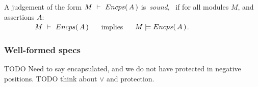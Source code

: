 \begin{definition}
\label{lem:encap-soundness}
A judgement of the form $M\ \vdash\ {Encps(\, A\, )}$  is\  \emph{sound}, \ if 
for all modules $M$, and assertions $A$:\\

$\strut \hspace{1.5cm} M\ \vdash\ {Encps(\, A\, )} \ \ \ \ $ implies $\ \ \ \ \satisfies{M}{\encaps{A}}$.
\end{definition}


 \subsubsection{Well-formed specs}
 TODO Need to say encapsulated, and we do not have protected in negative positions. TODO think about $\vee$ and protection.

%
%
%
%
%
%
%

